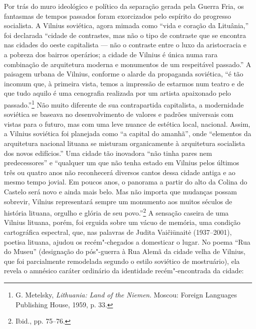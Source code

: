 Por trás do muro ideológico e político da separação gerada pela Guerra
Fria, os fantasmas de tempos passados foram exorcizados pelo espírito do
progresso socialista. A Vilnius soviética, agora mimada como ``vida e
coração da Lituânia,'' foi declarada ``cidade de contrastes, mas não o
tipo de contraste que se encontra nas cidades do oeste capitalista --- não
o contraste entre o luxo da aristocracia e a pobreza dos bairros
operários; a cidade de Vilnius é única numa rara combinação de
arquitetura moderna e monumentos de um respeitável passado.'' A paisagem
urbana de Vilnius, conforme o alarde da propaganda soviética, ``é tão
incomum que, à primeira vista, temos a impressão de estarmos num teatro
e de que tudo aquilo é uma cenografia realizada por um artista
apaixonado pelo passado.''\footnote{G. Metelsky, \textit{Lithuania: Land of the Niemen}. Moscou: Foreign Languages Publishing House, 1959, p. 33.} Não muito diferente de sua contrapartida capitalista, a modernidade soviética se baseava no desenvolvimento de valores e padrões
universais com vistas para o futuro, mas com uma leve nuance de estética
local, nacional. Assim, a Vilnius soviética foi planejada como ``a
capital do amanhã'', onde ``elementos da arquitetura nacional lituana se
misturam organicamente à arquitetura socialista dos novos edifícios.''
Uma cidade tão inovadora ``não tinha pares nem predecessores'' e
``qualquer um que não tenha estado em Vilnius pelos últimos três ou
quatro anos não reconhecerá diversos cantos dessa cidade antiga e ao
mesmo tempo jovial. Em poucos anos, o panorama a partir do alto da
Colina do Castelo será novo e ainda mais belo. Mas não importa que
mudanças possam sobrevir, Vilnius representará sempre um monumento aos
muitos séculos de história lituana, orgulho e glória de seu
povo.''\footnote{Ibid., pp. 75--76.} A sensação caseira de uma Vilnius
lituana, porém, foi erguida sobre um vácuo de memória, uma condição
cartográfica espectral, que, nas palavras de Judita Vaičiūnaitė
(1937--2001), poetisa lituana, ajudou os recém"-chegados a domesticar o
lugar. No poema ``Rua do Museu'' (designação do pós"-guerra à Rua Alemã
da cidade velha de Vilnius, que foi parcialmente remodelada segundo o
estilo soviético de mostruário), ela revela o amnésico caráter ordinário
da identidade recém"-encontrada da cidade:

